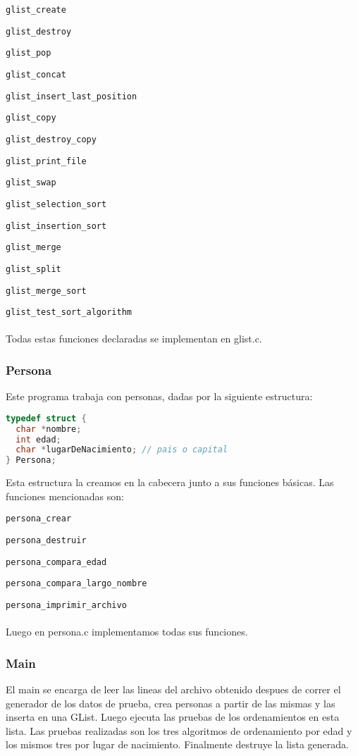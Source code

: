 \documentclass[]{article}
\begin{document}
\verb|glist_create|

\verb|glist_destroy|

\verb|glist_pop|

\verb|glist_concat|

\verb|glist_insert_last_position|

\verb|glist_copy|

\verb|glist_destroy_copy|

\verb|glist_print_file|

\verb|glist_swap|

\verb|glist_selection_sort|

\verb|glist_insertion_sort|

\verb|glist_merge|

\verb|glist_split|

\verb|glist_merge_sort|

\verb|glist_test_sort_algorithm|\\\\
Todas estas funciones declaradas se implementan en glist.c.
\subsubsection{Persona}
Este programa trabaja con personas, dadas por la siguiente estructura:
\begin{lstlisting}[language=C]
typedef struct {
  char *nombre;
  int edad;
  char *lugarDeNacimiento; // pais o capital
} Persona;
\end{lstlisting}
Esta estructura la creamos en la cabecera junto a sus funciones básicas.
Las funciones mencionadas son:

\verb|persona_crear|

\verb|persona_destruir|

\verb|persona_compara_edad|

\verb|persona_compara_largo_nombre|

\verb|persona_imprimir_archivo|\\\\
Luego en persona.c implementamos todas sus funciones.
\subsubsection{Main}
El main se encarga de leer las lineas del archivo obtenido despues de correr el generador de los datos de prueba, crea personas a partir de las mismas y las inserta en una GList.
Luego ejecuta las pruebas de los ordenamientos en esta lista. Las pruebas realizadas son los tres algoritmos de ordenamiento por edad y los mismos tres por lugar de nacimiento. Finalmente destruye la lista generada.
\end{document}
